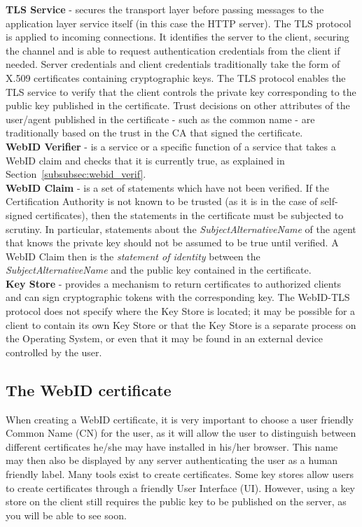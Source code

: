 \textbf{TLS Service} - secures the transport layer before passing messages to the application layer service itself (in this case the HTTP server). The TLS protocol~\cite{dierks2008transport} is applied to incoming connections. It identifies the server to the client, securing the channel and is able to request authentication credentials from the client if needed. Server credentials and client credentials traditionally take the form of X.509 certificates containing cryptographic keys. The TLS protocol enables the TLS service to verify that the client controls the private key corresponding to the public key published in the certificate. Trust decisions on other attributes of the user/agent published in the certificate - such as the common name - are traditionally based on the trust in the CA that signed the certificate.\\

\textbf{WebID Verifier} - is a service or a specific function of a service that takes a WebID claim and checks that it is currently true, as explained in Section~\ref{subsubsec:webid_verif}.\\

\textbf{WebID Claim} - is a set of statements which have not been verified. If the Certification Authority is not known to be trusted (as it is in the case of self-signed certificates), then the statements in the certificate must be subjected to scrutiny. In particular, statements about the \textit{SubjectAlternativeName} of the agent that knows the private key should not be assumed to be true until verified. A WebID Claim then is the \textit{statement of identity} between the \textit{SubjectAlternativeName} and the public key contained in the certificate.\\

\textbf{Key Store} - provides a mechanism to return certificates to authorized clients and can sign cryptographic tokens with the corresponding key. The WebID-TLS protocol does not specify where the Key Store is located; it may be possible for a client to contain its own Key Store or that the Key Store is a separate process on the Operating System, or even that it may be found in an external device controlled by the user.

\subsection{The WebID certificate}
\label{subsec:webid_cert}
When creating a WebID certificate, it is very important to choose a user friendly Common Name (CN) for the user, as it will allow the user to distinguish between different certificates he/she may have installed in his/her browser. This name may then also be displayed by any server authenticating the user as a human friendly label. Many tools exist to create certificates. Some key stores allow users to create certificates through a friendly User Interface (UI). However, using a key store on the client still requires the public key to be published on the server, as you will be able to see soon.\\

